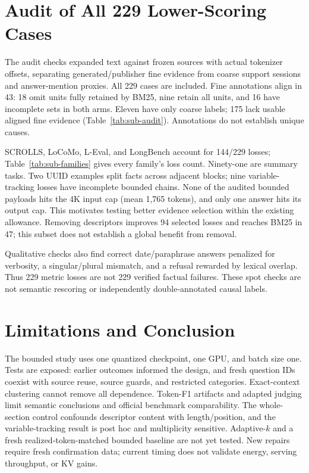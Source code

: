 \documentclass[runningheads]{llncs}
\begin{document}
\section{Audit of All 229 Lower-Scoring Cases}

The audit checks expanded text against frozen sources with actual tokenizer offsets, separating generated/publisher fine evidence from coarse support sessions and answer-mention proxies. All 229 cases are included. Fine annotations align in 43: 18 omit units fully retained by BM25, nine retain all units, and 16 have incomplete sets in both arms. Eleven have only coarse labels; 175 lack usable aligned fine evidence (Table~\ref{tab:sub-audit}). Annotations do not establish unique causes.

SCROLLS, LoCoMo, L-Eval, and LongBench account for 144/229 losses; Table~\ref{tab:sub-families} gives every family's loss count. Ninety-one are summary tasks. Two UUID examples split facts across adjacent blocks; nine variable-tracking losses have incomplete bounded chains. None of the audited bounded payloads hits the 4K input cap (mean 1,765 tokens), and only one answer hits its output cap. This motivates testing better evidence selection within the existing allowance. Removing descriptors improves 94 selected losses and reaches BM25 in 47; this subset does not establish a global benefit from removal.

Qualitative checks also find correct date/paraphrase answers penalized for verbosity, a singular/plural mismatch, and a refusal rewarded by lexical overlap. Thus 229 metric losses are not 229 verified factual failures. These spot checks are not semantic rescoring or independently double-annotated causal labels.

\section{Limitations and Conclusion}
The bounded study uses one quantized checkpoint, one GPU, and batch size one. Tests are exposed: earlier outcomes informed the design, and fresh question IDs coexist with source reuse, source guards, and restricted categories. Exact-context clustering cannot remove all dependence. Token-F1 artifacts and adapted judging limit semantic conclusions and official benchmark comparability. The whole-section control confounds descriptor content with length/position, and the variable-tracking result is post hoc and multiplicity sensitive. Adaptive-$k$ and a fresh realized-token-matched bounded baseline are not yet tested. New repairs require fresh confirmation data; current timing does not validate energy, serving throughput, or KV gains.
\end{document}
